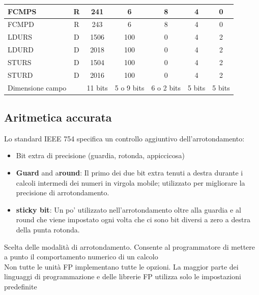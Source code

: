 \documentclass[12pt,a4paper]{article}
\begin{document}
\begin{center}
\begin{tabular}{|l|c|ccccc|}
FCMPS                                              & R       & \multicolumn{1}{c|}{241}     & \multicolumn{1}{c|}{6}          & \multicolumn{1}{c|}{8}          & \multicolumn{1}{c|}{4}      & 0      \\ \hline
FCMPD                                              & R       & \multicolumn{1}{c|}{243}     & \multicolumn{1}{c|}{6}          & \multicolumn{1}{c|}{8}          & \multicolumn{1}{c|}{4}      & 0      \\ \hline
LDURS                                              & D       & \multicolumn{1}{c|}{1506}    & \multicolumn{1}{c|}{100}        & \multicolumn{1}{c|}{0}          & \multicolumn{1}{c|}{4}      & 2      \\ \hline
LDURD                                              & D       & \multicolumn{1}{c|}{2018}    & \multicolumn{1}{c|}{100}        & \multicolumn{1}{c|}{0}          & \multicolumn{1}{c|}{4}      & 2      \\ \hline
STURS                                              & D       & \multicolumn{1}{c|}{1504}    & \multicolumn{1}{c|}{100}        & \multicolumn{1}{c|}{0}          & \multicolumn{1}{c|}{4}      & 2      \\ \hline
STURD                                              & D       & \multicolumn{1}{c|}{2016}    & \multicolumn{1}{c|}{100}        & \multicolumn{1}{c|}{0}          & \multicolumn{1}{c|}{4}      & 2      \\ \hline
Dimensione campo                                   &         & \multicolumn{1}{c|}{11 bits} & \multicolumn{1}{c|}{5 o 9 bits} & \multicolumn{1}{c|}{6 o 2 bits} & \multicolumn{1}{c|}{5 bits} & 5 bits \\ \hline
\end{tabular}
\end{center}

\subsection{Aritmetica accurata}
Lo standard IEEE 754 specifica un controllo aggiuntivo dell'arrotondamento:
\begin{itemize}
\item Bit extra di precisione (guardia, rotonda, appiccicosa)
\item \textbf{Guard} and a\textbf{round}: Il primo dei due bit extra tenuti a destra durante i calcoli intermedi dei numeri in virgola mobile; utilizzato per migliorare la precisione di arrotondamento.
\item \textbf{sticky bit}: Un po' utilizzato nell'arrotondamento oltre alla guardia e al round che viene impostato ogni volta che ci sono bit diversi a zero a destra della punta rotonda.
\end{itemize}
Scelta delle modalità di arrotondamento. Consente al programmatore di mettere a punto il comportamento numerico di un calcolo\\
Non tutte le unità FP implementano tutte le opzioni. La maggior parte dei linguaggi di programmazione e delle librerie FP utilizza solo le impostazioni predefinite
\end{document}

